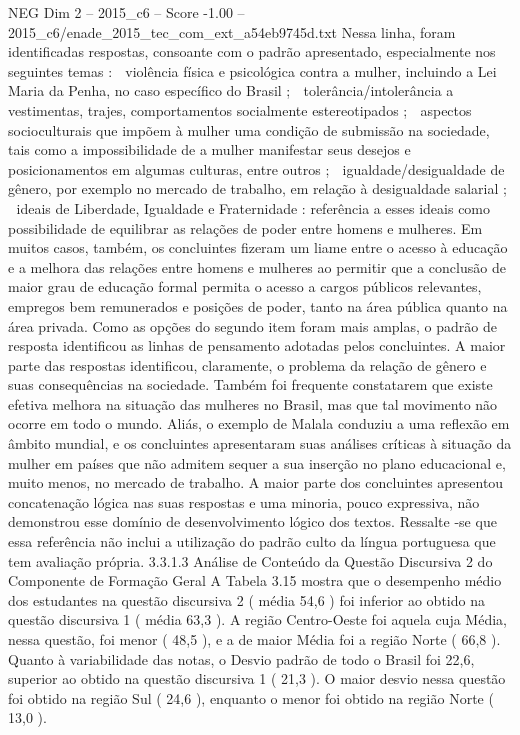 \begin{textsample}{NEG Dim 2 – 2015\_c6 – Score -1.00 – 2015\_c6/enade\_2015\_tec\_com\_ext\_a54eb9745d.txt}
Nessa linha, foram identificadas respostas, consoante com o padrão apresentado, especialmente nos seguintes temas :  violência física e psicológica contra a mulher, incluindo a Lei Maria da Penha, no caso específico do Brasil ;  tolerância/intolerância a vestimentas, trajes, comportamentos socialmente estereotipados ;  aspectos socioculturais que impõem à mulher uma condição de submissão na sociedade, tais como a impossibilidade de a mulher manifestar seus desejos e posicionamentos em algumas culturas, entre outros ;  igualdade/desigualdade de gênero, por exemplo no mercado de trabalho, em relação à desigualdade salarial ;  ideais de Liberdade, Igualdade e Fraternidade : referência a esses ideais como possibilidade de equilibrar as relações de poder entre homens e mulheres.
Em muitos casos, também, os concluintes fizeram um liame entre o acesso à educação e a melhora das relações entre homens e mulheres ao permitir que a conclusão de maior grau de educação formal permita o acesso a cargos públicos relevantes, empregos bem remunerados e posições de poder, tanto na área pública quanto na área privada.
Como as opções do segundo item foram mais amplas, o padrão de resposta identificou as linhas de pensamento adotadas pelos concluintes.
A maior parte das respostas identificou, claramente, o problema da relação de gênero e suas consequências na sociedade.
Também foi frequente constatarem que existe efetiva melhora na situação das mulheres no Brasil, mas que tal movimento não ocorre em todo o mundo.
Aliás, o exemplo de Malala conduziu a uma reflexão em âmbito mundial, e os concluintes apresentaram suas análises críticas à situação da mulher em países que não admitem sequer a sua inserção no plano educacional e, muito menos, no mercado de trabalho.
A maior parte dos concluintes apresentou concatenação lógica nas suas respostas e uma minoria, pouco expressiva, não demonstrou esse domínio de desenvolvimento lógico dos textos.
Ressalte -se que essa referência não inclui a utilização do padrão culto da língua portuguesa que tem avaliação própria. 3.3.1.3 Análise de Conteúdo da Questão Discursiva 2 do Componente de Formação Geral A Tabela 3.15 mostra que o desempenho médio dos estudantes na questão discursiva 2 ( média 54,6 ) foi inferior ao obtido na questão discursiva 1 ( média 63,3 ).
A região Centro-Oeste foi aquela cuja Média, nessa questão, foi menor ( 48,5 ), e a de maior Média foi a região Norte ( 66,8 ).
Quanto à variabilidade das notas, o Desvio padrão de todo o Brasil foi 22,6, superior ao obtido na questão discursiva 1 ( 21,3 ).
O maior desvio nessa questão foi obtido na região Sul ( 24,6 ), enquanto o menor foi obtido na região Norte ( 13,0 ).

\end{textsample}
